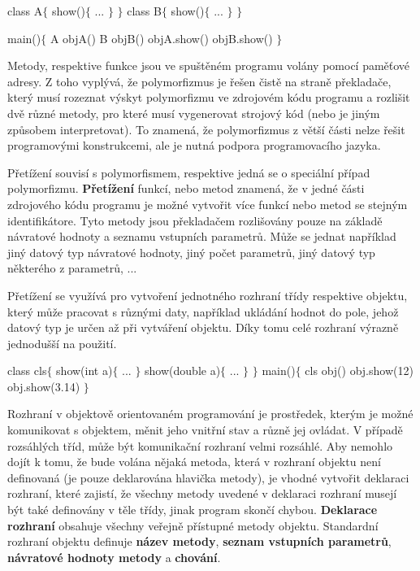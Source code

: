 \vskip 4mm
{
\verbatim
\odradkovat
class A$\{$\odradkovat
\hskip 4mm show()$\{$\odradkovat
\hskip 8mm ...\odradkovat
\hskip 4mm $\}$\odradkovat
$\}$\odradkovat
\vskip 3mm\odradkovat
class B$\{$\odradkovat
\hskip 4mm show()$\{$\odradkovat
\hskip 8mm ...\odradkovat
\hskip 4mm $\}$\odradkovat
$\}$\odradkovat

\vskip 3mm\odradkovat
main()$\{$\odradkovat
\hskip 4mm A objA()\odradkovat
\hskip 4mm B objB()\odradkovat
\vskip 3mm\odradkovat
\hskip 4mm objA.show()\odradkovat
\hskip 4mm objB.show()\odradkovat
\odradkovat
$\}$\odradkovat
}
\vskip 4mm

Metody, respektive funkce jsou ve spuštěném programu volány pomocí paměťové adresy. Z toho vyplývá, že polymorfizmus je řešen čistě na straně překladače, který musí rozeznat výskyt polymorfizmu ve zdrojovém kódu programu a rozlišit dvě různé metody, pro které musí vygenerovat strojový kód (nebo je jiným způsobem interpretovat). To znamená, že polymorfizmus z větší části nelze řešit programovými konstrukcemi, ale je nutná podpora programovacího jazyka.	


Přetížení souvisí s polymorfismem, respektive jedná se o speciální případ polymorfizmu. {\bf Přetížení} funkcí, nebo metod znamená, že v jedné části zdrojového kódu programu je možné vytvořit více funkcí nebo metod se stejným identifikátore. Tyto metody jsou překladačem rozlišovány pouze na základě návratové hodnoty a seznamu vstupních parametrů. Může se jednat například jiný datový typ návratové hodnoty, jiný počet parametrů, jiný datový typ některého z parametrů, ... 

Přetížení se využívá pro vytvoření jednotného rozhraní třídy respektive objektu, který může pracovat s různými daty, například ukládání hodnot do pole, jehož datový typ je určen až při vytváření objektu. Díky tomu celé rozhraní výrazně jednodušší na použití.

\vskip 4mm
{
\verbatim
\odradkovat
class cls$\{$\odradkovat
\hskip 4mm show(int a)$\{$\odradkovat
\hskip 8mm ...\odradkovat
\hskip 4mm $\}$\odradkovat
\vskip 3mm\odradkovat
\hskip 4mm show(double a)$\{$\odradkovat
\hskip 8mm ...\odradkovat
\hskip 4mm $\}$\odradkovat
$\}$\odradkovat
\vskip 3mm\odradkovat
main()$\{$\odradkovat
\hskip 4mm cls obj()\odradkovat
\vskip 3mm\odradkovat
\hskip 4mm obj.show(12)\odradkovat
\hskip 4mm obj.show(3.14)\odradkovat
\odradkovat
$\}$\odradkovat
}
\vskip 4mm


Rozhraní v objektově orientovaném programování je prostředek, kterým je možné komunikovat s objektem, měnit jeho vnitřní stav a různě jej ovládat. V případě rozsáhlých tříd, může být komunikační rozhraní velmi rozsáhlé. Aby nemohlo dojít k tomu, že bude volána nějaká metoda, která v rozhraní objektu není definovaná (je pouze deklarována hlavička metody), je vhodné vytvořit deklaraci rozhraní, které zajistí, že všechny metody uvedené v deklaraci rozhraní musejí být také definovány v těle třídy, jinak program skončí chybou. {\bf Deklarace rozhraní} obsahuje všechny veřejně přístupné metody objektu. Standardní rozhraní objektu definuje {\bf název metody}, {\bf seznam vstupních parametrů}, {\bf návratové hodnoty metody} a {\bf chování}.

